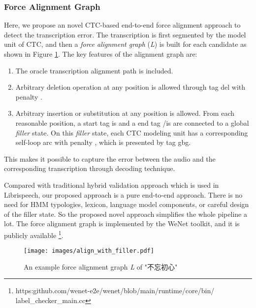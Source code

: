 \documentclass{article}
\begin{document}
\vspace{-1em}
\subsubsection{Force Alignment Graph}
\vspace{-0.5em}
Here, we propose an novel CTC-based end-to-end force alignment approach to detect the transcription error.
The transcription is first segmented by the model unit of CTC, and then a \textit{force alignment graph} (\textit{L}) is built for each candidate as shown in Figure \ref{fig:align_with_filler}. The key features of the alignment graph are:

\vspace{-0.5em}
\begin{enumerate}
    \item The oracle transcription alignment path is included.
    \vspace{-0.2em}
    \item Arbitrary deletion operation at any position is allowed through tag \textlangle{}del\textrangle{} with penalty .
    \vspace{-0.2em}
    \item Arbitrary insertion or substitution at any position is allowed. From each reasonable position, a start tag \textlangle{}is\textrangle{} and a end tag \textlangle{}/is\textrangle{} are connected to a global \textit{filler} state. On this \textit{filler} state, each CTC modeling unit has a corresponding self-loop arc with penalty , which is presented by tag \textlangle{}gbg\textrangle{}.
\end{enumerate}
\vspace{-0.5em}

This makes it possible to capture the error between the audio and the corresponding transcription through decoding technique.

Compared with traditional hybrid validation approach which is used in Librispeech, our proposed approach is a pure end-to-end approach. There is no need for HMM typologies, lexicon, language model components, or careful design of the filler state. So the proposed novel approach simplifies the whole pipeline a lot. The force
alignment graph is implemented by the WeNet toolkit, and it is publicly available \footnote{https:github.com/wenet-e2e/wenet/blob/main/runtime/core/bin/\\label\_checker\_main.cc}.

\begin{CJK*}{UTF8}{gbsn}

\begin{figure}[ht]
  \vspace{-1.5em}
  \centering
  \texttt{[image: images/align\_with\_filler.pdf]}
  \vspace{-2em}
  \caption{An example force alignment graph \textit{L} of "不忘初心"}
  \label{fig:align_with_filler}
  \vspace{-2em}
\end{figure}

\end{CJK*}
\end{document}
